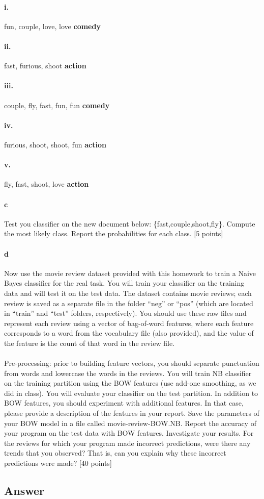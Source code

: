 \documentclass{article}
\begin{document}
\paragraph{i.} fun, couple, love, love \textbf{comedy}
\paragraph{ii.} fast, furious, shoot \textbf{action}
\paragraph{iii.} couple, fly, fast, fun, fun \textbf{comedy}
\paragraph{iv.} furious, shoot, shoot, fun \textbf{action}
\paragraph{v.} fly, fast, shoot, love \textbf{action}

\paragraph{c} Test you classifier on the new document below: \{fast,couple,shoot,fly\}. Compute the most likely class. Report the probabilities for each class. [5 points]

\paragraph{d} Now use the movie review dataset provided with this homework to train a Naive Bayes classifier for the real task. You will train your classifier on the training data and will test it on the test data. The dataset contains movie reviews; each review is saved as a separate file in the folder “neg” or “pos” (which are located in “train” and “test” folders, respectively). You should use these raw files and represent each review using a vector of bag-of-word features, where each feature corresponds to a word from the vocabulary file (also provided), and the value of the feature is the count of that word in the review file.

\paragraph{} Pre-processing: prior to building feature vectors, you should separate punctuation from words and lowercase the words in the reviews. You will train NB classifier on the training partition using the BOW features (use add-one smoothing, as we did in class). You will evaluate your classifier on the test partition. In addition to BOW features, you should experiment with additional features. In that case, please provide a description of the features in your report. Save the parameters of your BOW model in a file called movie-review-BOW.NB\@. Report the accuracy of your program on the test data with BOW features.
Investigate your results. For the reviews for which your program made incorrect predictions, were there any trends that you observed? That is, can you explain why these incorrect predictions were made? [40 points]

\subsection*{Answer}
\end{document}
